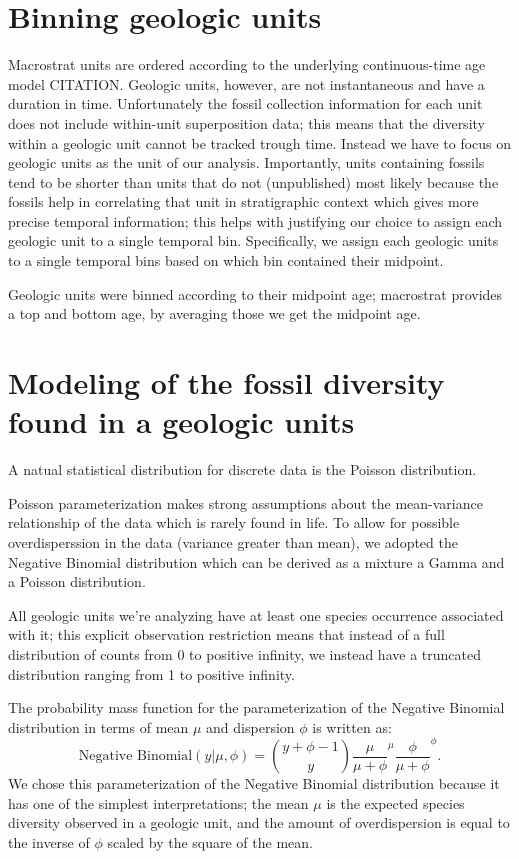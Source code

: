 \documentclass[12pt,letterpaper]{article}
\begin{document}
\section{Binning geologic units}

Macrostrat units are ordered according to the underlying continuous-time age model CITATION. Geologic units, however, are not instantaneous and have a duration in time. Unfortunately the fossil collection information for each unit does not include within-unit superposition data; this means that the diversity within a geologic unit cannot be tracked trough time. Instead we have to focus on geologic units as the unit of our analysis. Importantly, units containing fossils tend to be shorter than units that do not (unpublished) most likely because the fossils help in correlating that unit in stratigraphic context which gives more precise temporal information; this helps with justifying our choice to assign each geologic unit to a single temporal bin. Specifically, we assign each geologic units to a single temporal bins based on which bin contained their midpoint. 



Geologic units were binned according to their midpoint age; macrostrat provides a top and bottom age, by averaging those we get the midpoint age.






\section{Modeling of the fossil diversity found in a geologic units}

A natual statistical distribution for discrete data is the Poisson distribution. 

Poisson parameterization makes strong assumptions about the mean-variance relationship of the data which is rarely found in life. To allow for possible overdisperssion in the data (variance greater than mean), we adopted the Negative Binomial distribution which can be derived as a mixture a Gamma and a Poisson distribution.

All geologic units we're analyzing have at least one species occurrence associated with it; this explicit observation restriction means that instead of a full distribution of counts from 0 to positive infinity, we instead have a truncated distribution ranging from 1 to positive infinity.


The probability mass function for the parameterization of the Negative Binomial distribution in terms of mean \(\mu\) and dispersion \(\phi\) is written as:
\begin{equation}
  \text{Negative Binomial}(y | \mu, \phi) = \binom{y + \phi - 1}{y} \frac{\mu}{\mu + \phi}^{\mu} \frac{\phi}{\mu + \phi}^{\phi}.
\end{equation}
We chose this parameterization of the Negative Binomial distribution because it has one of the simplest interpretations; the mean \(\mu\) is the expected species diversity observed in a geologic unit, and the amount of overdispersion is equal to the inverse of \(\phi\) scaled by the square of the mean. 
\end{document}
